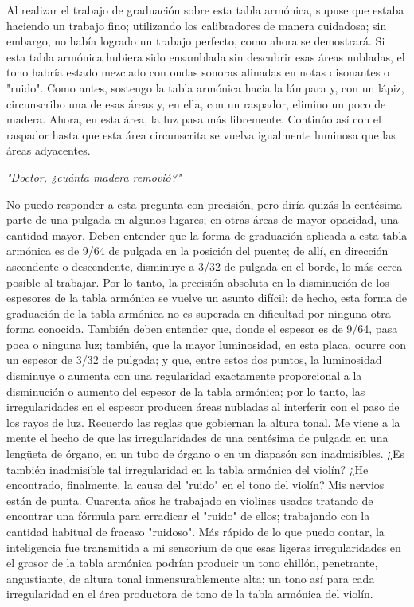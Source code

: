\documentclass[12pt]{book}
\begin{document}
Al realizar el trabajo de graduación sobre esta tabla armónica, supuse que estaba haciendo un trabajo fino; utilizando los calibradores de manera cuidadosa; sin embargo, no había logrado un trabajo perfecto, como ahora se demostrará. Si esta tabla armónica hubiera sido ensamblada sin descubrir esas áreas nubladas, el tono habría estado mezclado con ondas sonoras afinadas en notas disonantes o "ruido". Como antes, sostengo la tabla armónica hacia la lámpara y, con un lápiz, circunscribo una de esas áreas y, en ella, con un raspador, elimino un poco de madera. Ahora, en esta área, la luz pasa más libremente. Continúo así con el raspador hasta que esta área circunscrita se vuelva igualmente luminosa que las áreas adyacentes.

\textit{"Doctor, ¿cuánta madera removió?"}

No puedo responder a esta pregunta con precisión, pero diría quizás la centésima parte de una pulgada en algunos lugares; en otras áreas de mayor opacidad, una cantidad mayor. Deben entender que la forma de graduación aplicada a esta tabla armónica es de 9/64 de pulgada en la posición del puente; de allí, en dirección ascendente o descendente, disminuye a 3/32 de pulgada en el borde, lo más cerca posible al trabajar. Por lo tanto, la precisión absoluta en la disminución de los espesores de la tabla armónica se vuelve un asunto difícil; de hecho, esta forma de graduación de la tabla armónica no es superada en dificultad por ninguna otra forma conocida. También deben entender que, donde el espesor es de 9/64, pasa poca o ninguna luz; también, que la mayor luminosidad, en esta placa, ocurre con un espesor de 3/32 de pulgada; y que, entre estos dos puntos, la luminosidad disminuye o aumenta con una regularidad exactamente proporcional a la disminución o aumento del espesor de la tabla armónica; por lo tanto, las irregularidades en el espesor producen áreas nubladas al interferir con el paso de los rayos de luz. Recuerdo las reglas que gobiernan la altura tonal. Me viene a la mente el hecho de que las irregularidades de una centésima de pulgada en una lengüeta de órgano, en un tubo de órgano o en un diapasón son inadmisibles. ¿Es también inadmisible tal irregularidad en la tabla armónica del violín? ¿He encontrado, finalmente, la causa del "ruido" en el tono del violín? Mis nervios están de punta. Cuarenta años he trabajado en violines usados tratando de encontrar una fórmula para erradicar el "ruido" de ellos; trabajando con la cantidad habitual de fracaso "ruidoso". Más rápido de lo que puedo contar, la inteligencia fue transmitida a mi sensorium de que esas ligeras irregularidades en el grosor de la tabla armónica podrían producir un tono chillón, penetrante, angustiante, de altura tonal inmensurablemente alta; un tono así para cada irregularidad en el área productora de tono de la tabla armónica del violín.
\end{document}
